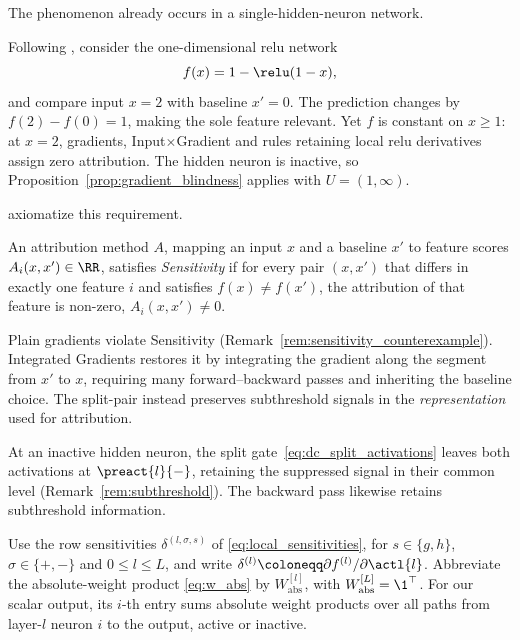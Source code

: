 The phenomenon already occurs in a single-hidden-neuron network.

\begin{remark}\label{rem:sensitivity_counterexample}
Following \textcite{Sundararajan2017}, consider the one-dimensional \ac{relu} network
\begin{equation}
	f(x) = 1 - \relu(1 - x),
	\label{eq:ig_counterexample}
\end{equation}
and compare input $x=2$ with baseline $x'=0$. The prediction changes by $f(2)-f(0)=1$, making the sole feature relevant. Yet $f$ is constant on $x\geq1$: at $x=2$, gradients, Input$\times$Gradient and rules retaining local \ac{relu} derivatives assign zero attribution. The hidden neuron is inactive, so Proposition~\ref{prop:gradient_blindness} applies with $U=(1,\infty)$.
\end{remark}

\textcite{Sundararajan2017} axiomatize this requirement.

\begin{definition}[Sensitivity(a)]\label{def:sensitivity}
An attribution method $A$, mapping an input $x$ and a baseline $x'$ to feature scores $A_i(x, x') \in \RR$, satisfies \emph{Sensitivity} if for every pair $(x, x')$ that differs in exactly one feature $i$ and satisfies $f(x) \neq f(x')$, the attribution of that feature is non-zero, $A_i(x, x') \neq 0$.
\end{definition}

Plain gradients violate Sensitivity (Remark~\ref{rem:sensitivity_counterexample}). Integrated Gradients restores it by integrating the gradient along the segment from $x'$ to $x$, requiring many forward--backward passes and inheriting the baseline choice. The split-pair instead preserves subthreshold signals in the \emph{representation} used for attribution.

At an inactive hidden neuron, the split gate~\eqref{eq:dc_split_activations} leaves both activations at $\preact{l}{-}$, retaining the suppressed signal in their common level (Remark~\ref{rem:subthreshold}). The backward pass likewise retains subthreshold information.

\begin{definition}\label{def:local_sensitivities}
Use the row sensitivities $\delta^{(l,\sigma,s)}$ of \eqref{eq:local_sensitivities}, for $s\in\{g,h\}$, $\sigma\in\{+,-\}$ and $0\le l\le L$, and write $\delta^{(l)}\coloneqq\partial f^{(l)}/\partial\actl{l}$. Abbreviate the absolute-weight product \eqref{eq:w_abs} by $W_{\mathrm{abs}}^{[l]}$, with $W_{\mathrm{abs}}^{[L]}=\1^\top$. For our scalar output, its $i$-th entry sums absolute weight products over all paths from layer-$l$ neuron $i$ to the output, active or inactive.
\end{definition}

